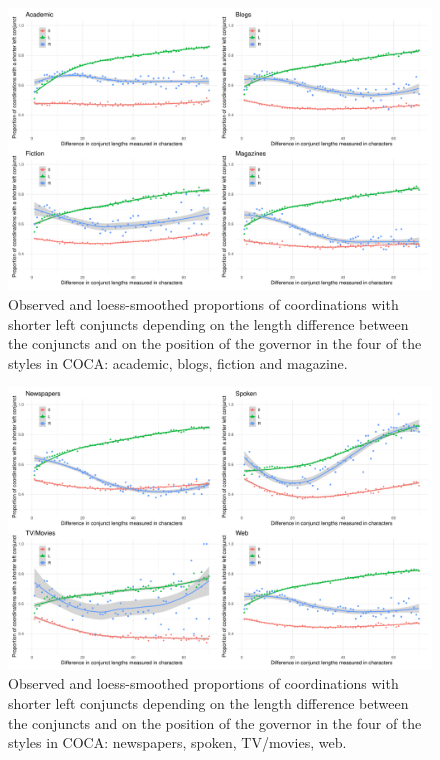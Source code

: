 \begin{figure}[h]
\hspace{-.1\textwidth}
\includegraphics[width=1.2\textwidth]{inputs/genres1.pdf}
\caption{Observed and loess-smoothed proportions of coordinations with shorter left conjuncts depending on the length difference between the conjuncts and on the position of the governor in the four of the styles in COCA: academic, blogs, fiction and magazine.}
\end{figure}

\begin{figure}[h]
\hspace{-.1\textwidth}
\includegraphics[width=1.2\textwidth]{inputs/genres2.pdf}
\caption{Observed and loess-smoothed proportions of coordinations with shorter left conjuncts depending on the length difference between the conjuncts and on the position of the governor in the four of the styles in COCA: newspapers, spoken, TV/movies, web.}
\end{figure}